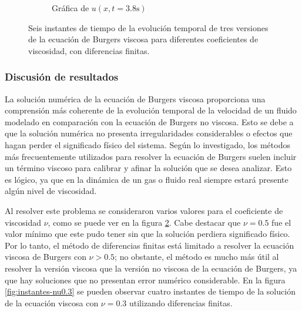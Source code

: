 \documentclass[12pt]{article}
\begin{document}
\begin{figure}[ht]
\begin{subfigure}{0.4\textwidth}
			\caption*{Gráfica de $u(x,t=3.8\unit{\second})$}
			\label{fig:vis1ddf6}
		\end{subfigure}
		\caption{Seis instantes de tiempo de la evolución temporal de tres versiones de la ecuación de Burgers viscosa para diferentes coeficientes de viscosidad, con diferencias finitas.}
		\label{fig:instantesvis1DDF}
	\end{figure}
	\subsubsection{Discusión de resultados}
	La solución numérica de la ecuación de Burgers viscosa proporciona una comprensión más coherente de la evolución temporal de la velocidad de un fluido modelado en comparación con la ecuación de Burgers no viscosa. Esto se debe a que la solución numérica no presenta irregularidades considerables o efectos que hagan perder el significado físico del sistema. Según lo investigado, los métodos más frecuentemente utilizados para resolver la ecuación de Burgers suelen incluir un término viscoso para calibrar y afinar la solución que se desea analizar. Esto es lógico, ya que en la dinámica de un gas o fluido real siempre estará presente algún nivel de viscosidad.
	
	Al resolver este problema se consideraron varios valores para el coeficiente de viscosidad $\nu$, como se puede ver en la figura \ref{fig:instantesvis1DDF}. Cabe destacar que $\nu = 0.5$ fue el valor mínimo que este pudo tener sin que la solución perdiera significado físico. Por lo tanto, el método de diferencias finitas está limitado a resolver la ecuación viscosa de Burgers con $\nu > 0.5$; no obstante, el método es mucho más útil al resolver la versión viscosa que la versión no viscosa de la ecuación de Burgers, ya que hay soluciones que no presentan error numérico considerable. En la figura \ref{fig:instantes-nu0.3} se pueden observar cuatro instantes de tiempo de la solución de la ecuación viscosa con $\nu = 0.3$ utilizando diferencias finitas.
	
\end{document}
